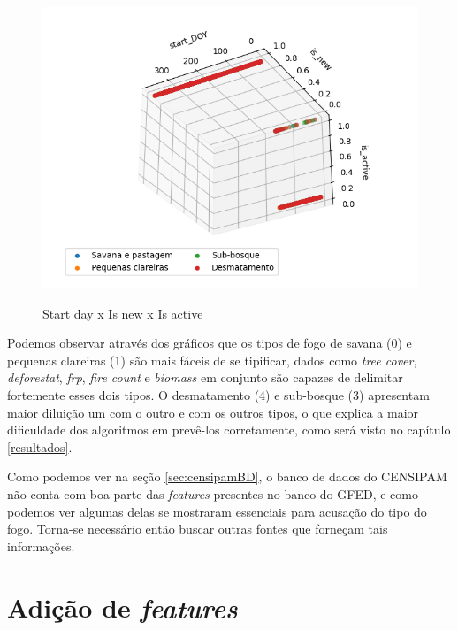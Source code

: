 \begin{multicols}{2}
\begin{figure}[H]
    \caption{Start day x Is new x Is active}
     
    \centering 
    \includegraphics[width=1.1\linewidth]{tg1/figuras/start_DOYxis_newxis_active--30-120.png}
    \label{figura:seven}
\end{figure}
            
\end{multicols}

Podemos observar através dos gráficos que os tipos de fogo de savana (0) e pequenas clareiras (1) são mais fáceis de se tipificar, dados como \textit{tree cover}, \textit{deforestat}, \textit{frp}, \textit{fire count} e \textit{biomass} em conjunto são capazes de delimitar fortemente esses dois tipos. O desmatamento (4) e sub-bosque (3) apresentam maior diluição um com o outro e com os outros tipos, o que explica a maior dificuldade dos algoritmos em prevê-los corretamente, como será visto no capítulo \ref{resultados}.

Como podemos ver na seção \ref{sec:censipamBD}, o banco de dados do CENSIPAM não conta com boa parte das \textit{features} presentes no banco do GFED, e como podemos ver algumas delas se mostraram essenciais para acusação do tipo do fogo. Torna-se necessário então buscar outras fontes que forneçam tais informações.


\section{Adição de \textit{features}}

